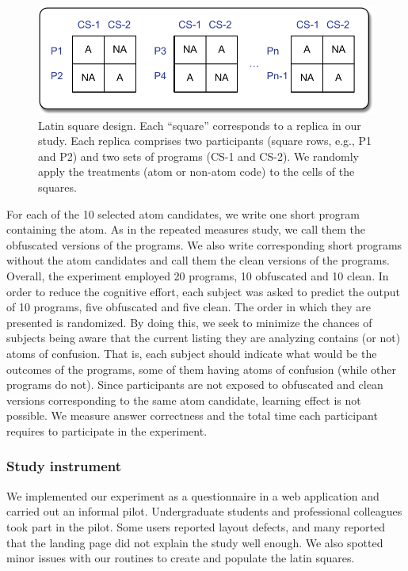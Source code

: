   \begin{figure}[htb!]
      \noindent
      \centering
      \includegraphics[scale=.50]{images/latin-square.pdf}
      \caption{Latin square design. Each ``square'' corresponds to 
      a replica in our study. Each replica comprises two participants (square rows, e.g., P1 and P2) 
      and two sets of programs (CS-1 and CS-2). We randomly apply the 
      treatments (atom or non-atom code) to the cells of the squares.} 
      \label{fig:latinsquare}
  \end{figure}

For each of the 10 selected atom candidates, we write one short program containing the atom. As in the repeated measures study, we call them the obfuscated versions of the programs. We also write corresponding short programs without the atom candidates and call them the clean versions of the programs. Overall, the experiment employed 20 programs, 10 obfuscated and 10 clean. In order to reduce the cognitive effort, each subject was asked to predict the output of 10 programs, five obfuscated and five clean. The order in which they are presented is randomized. By doing this, we seek to minimize the chances of subjects being aware that the current listing they are analyzing contains (or not) atoms of confusion. That is, each subject should indicate what would be the outcomes of the programs, some of them having atoms of confusion (while other programs do not). Since participants are not exposed to obfuscated and clean versions corresponding to the same atom candidate, learning effect is not possible. We measure answer correctness and the total time each participant requires to participate in the experiment.

\subsubsection*{Study instrument} 

We implemented our experiment as a questionnaire in a web application and 
carried out an informal pilot.%
Undergraduate students and professional colleagues took part in the pilot. Some users reported layout defects, and many reported that the landing page did not explain the study well enough. We also spotted minor issues with our routines to create and populate the latin squares. 

